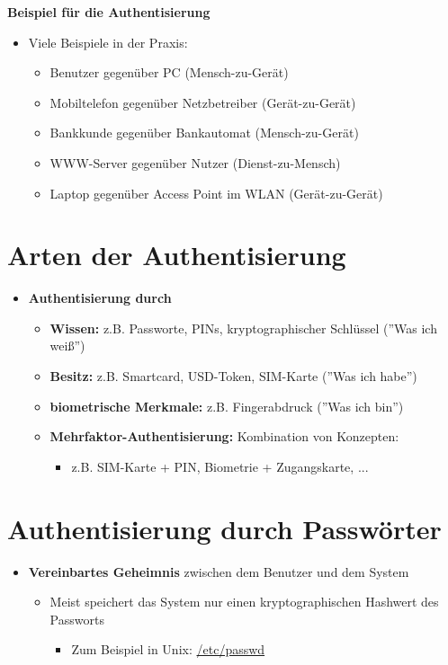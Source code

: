 \documentclass[openany]{book}
\begin{document}
\textbf{Beispiel für die Authentisierung}

\begin{itemize}
    \item Viele Beispiele in der Praxis:
    \begin{itemize}
        \item Benutzer gegenüber PC (Mensch-zu-Gerät)
        \item Mobiltelefon gegenüber Netzbetreiber (Gerät-zu-Gerät)
        \item Bankkunde gegenüber Bankautomat (Mensch-zu-Gerät)
        \item WWW-Server gegenüber Nutzer (Dienst-zu-Mensch)
        \item Laptop gegenüber Access Point im WLAN (Gerät-zu-Gerät)
    \end{itemize}
\end{itemize}

\section{Arten der Authentisierung}

\begin{itemize}
    \item \textbf{Authentisierung durch}
    \begin{itemize}
        \item \textbf{Wissen:} z.B. Passworte, PINs, kryptographischer Schlüssel (''Was ich weiß'')
        \item \textbf{Besitz:} z.B. Smartcard, USD-Token, SIM-Karte (''Was ich habe'')
        \item \textbf{biometrische Merkmale:} z.B. Fingerabdruck (''Was ich bin'')
        \item \textbf{Mehrfaktor-Authentisierung:} Kombination von Konzepten:
        \begin{itemize}
            \item z.B. SIM-Karte + PIN, Biometrie + Zugangskarte, ...
        \end{itemize}
    \end{itemize}
\end{itemize}

\section{Authentisierung durch Passwörter}

\begin{itemize}
    \item \textbf{Vereinbartes Geheimnis} zwischen dem Benutzer und dem System
    \begin{itemize}
        \item Meist speichert das System nur einen kryptographischen Hashwert des Passworts
        \begin{itemize}
            \item Zum Beispiel in Unix: \underline{/etc/passwd}
        \end{itemize}
    \end{itemize}
\end{itemize}
\end{document}
